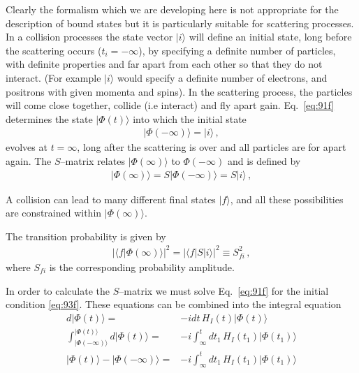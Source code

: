 Clearly the formalism which we are developing here is not appropriate for the description of bound states but it is particularly suitable for scattering processes. In a collision processes the state vector $|i\rangle$ will define an initial state, long before the scattering occurs ($t_i=-\infty$), by specifying a definite number of particles, with definite properties and far apart from each other so that they do not interact. (For example $|i\rangle$ would specify a definite number of electrons, and positrons with given momenta and spins). In the scattering process, the particles will come close together, collide (i.e interact) and fly apart gain. Eq.~\eqref{eq:91f} determines the state $|\Phi(t)\rangle$ into which the initial state
\begin{align}
  |\Phi(-\infty)\rangle=|i\rangle\,,
\end{align}
evolves at $t=\infty$, long after the scattering is over and all particles are for apart again. The $S$--matrix relates $|\Phi(\infty)\rangle$ to $\Phi(-\infty)$ and is defined by
\begin{align}
  |\Phi(\infty)\rangle=S|\Phi(-\infty)\rangle=S|i\rangle\,,
\end{align}

A collision can lead to many different final states $|f\rangle$, and all these possibilities are constrained within $|\Phi(\infty)\rangle$.

The transition probability is given by
\begin{align}
  \left|\langle f|\Phi(\infty)\rangle\right|^2=  \left|\langle f|S|i\rangle\right|^2\equiv S_{f i}^2\,,
\end{align}
where $S_{f i}$ is the corresponding probability amplitude.

In order to calculate the $S$--matrix we must solve Eq.~\eqref{eq:91f} for the initial condition \eqref{eq:93f}. These equations can be combined into the integral equation
\begin{align}
 d |\Phi(t)\rangle=&-i d t\,H_I(t)|\Phi(t)\rangle\nonumber\\
\int_{|\Phi(-\infty)\rangle}^{|\Phi(t)\rangle} d |\Phi(t)\rangle=&-i \int_\infty^t d t_1\,H_I(t_1)|\Phi(t_1)\rangle\nonumber\\
|\Phi(t)\rangle-|\Phi(-\infty)\rangle=&-i \int_\infty^t d t_1\,H_I(t_1)|\Phi(t_1)\rangle\nonumber\\
\end{align}

